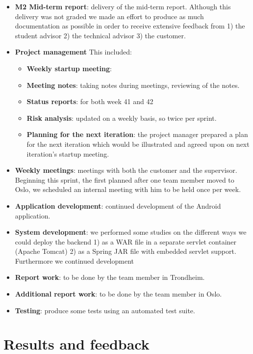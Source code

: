 \begin{itemize}
\item \textbf{M2 Mid-term report}:
	delivery of the mid-term report. Although this delivery was not graded we made an effort
	to produce as much documentation as possible in order to receive extensive feedback from
	1) the student advisor 2) the technical advisor 3) the customer.
\item \textbf{Project management}\newline
	This included:
	\begin{itemize}
		\item \textbf{Weekly startup meeting}:
		\item \textbf{Meeting notes}:
			taking notes during meetings, reviewing of the notes.
		\item \textbf{Status reports}:
			for both week 41 and 42
		\item \textbf{Risk analysis}:
			updated on a weekly basis, so twice per sprint.
		\item \textbf{Planning for the next iteration}:
			the project manager prepared a plan for the next iteration
			which would be illustrated and agreed upon on next iteration's startup meeting.
	\end{itemize}
	\item \textbf{Weekly meetings}: 
		meetings with both the customer and the supervisor. Beginning this sprint, the first
		planned after one team member moved to Oslo, we scheduled an internal meeting with him
		to be held once per week.
	\item \textbf{Application development}:
		continued development of the Android application.
	\item \textbf{System development}:
		we performed some studies on the different ways we could deploy the backend
		1) as a WAR file in a separate servlet container (Apache Tomcat) 2) as a Spring JAR file
		with embedded servlet support. Furthermore we continued development
	\item \textbf{Report work}:
		to be done by the team member in Trondheim.
	\item \textbf{Additional report work}:
		to be done by the team member in Oslo.
	\item \textbf{Testing}:
		produce some tests using an automated test suite.
\end{itemize}

\section{Results and feedback}

